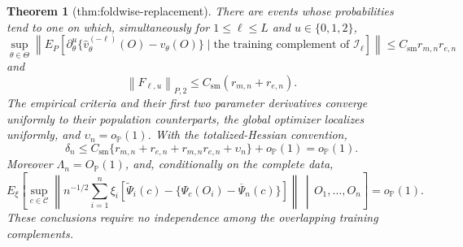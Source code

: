 \documentclass{article}
\newtheorem{theorem}{Theorem}
\begin{document}
\begin{theorem}[thm:foldwise-replacement]\label{thm:foldwise-replacement}
There are events whose probabilities tend to one on which, simultaneously for \(1\leq\ell\leq L\) and \(u\in\{0,1,2\}\),
\[
 \sup_{\theta\in\Theta}\left\|E_P\left[\partial_\theta^u\{\widehat v_\theta^{(-\ell)}(O)-v_\theta(O)\}\mid\text{the training complement of }\mathcal I_\ell\right]\right\|
 \leq C_{\mathrm{sm}}r_{m,n}r_{e,n}
\]
and
\[
 \left\|F_{\ell,u}\right\|_{P,2}
 \leq C_{\mathrm{sm}}(r_{m,n}+r_{e,n}).
\]
The empirical criteria and their first two parameter derivatives converge uniformly to their population counterparts, the global optimizer localizes uniformly, and \(\upsilon_n=o_{\mathbb P}(1)\). With the totalized-Hessian convention,
\[
 \delta_n\leq C_{\mathrm{sm}}\{r_{m,n}+r_{e,n}+r_{m,n}r_{e,n}+\upsilon_n\}+o_{\mathbb P}(1)=o_{\mathbb P}(1).
\]
Moreover \(\Lambda_n=O_{\mathbb P}(1)\), and, conditionally on the complete data,
\[
 E_\xi\left[\sup_{c\in\mathcal C}\left\|n^{-1/2}\sum_{i=1}^n\xi_i\left[\widetilde\Psi_i(c)-\{\Psi_c(O_i)-\overline\Psi_n(c)\}\right]\right\|\,\middle|\,O_1,\ldots,O_n\right]=o_{\mathbb P}(1).
\]
These conclusions require no independence among the overlapping training complements.
\end{theorem}
\end{document}
